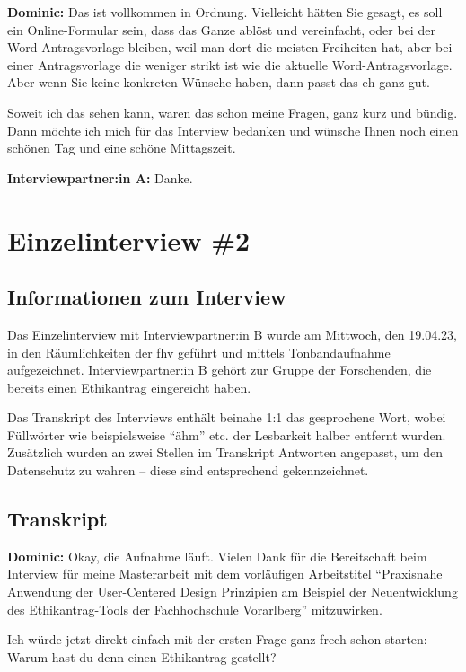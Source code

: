 \documentclass[a4paper,12pt,twoside]{scrreprt}
\begin{document}
\textbf{Dominic:} Das ist vollkommen in Ordnung. Vielleicht hätten Sie gesagt, es soll ein Online-Formular sein, dass das Ganze ablöst und vereinfacht, oder bei der Word-Antragsvorlage bleiben, weil man dort die meisten Freiheiten hat, aber bei einer Antragsvorlage die weniger strikt ist wie die aktuelle Word-Antragsvorlage. Aber wenn Sie keine konkreten Wünsche haben, dann passt das eh ganz gut. 

Soweit ich das sehen kann, waren das schon meine Fragen, ganz kurz und bündig. Dann möchte ich mich für das Interview bedanken und wünsche Ihnen noch einen schönen Tag und eine schöne Mittagszeit.

\textbf{Interviewpartner:in A:} Danke.

\chapter{Einzelinterview \#2}
\label{appendix:interview-2}

\section{Informationen zum Interview}
\label{appendix:interview-2-infos}

Das Einzelinterview mit Interviewpartner:in B wurde am Mittwoch, den 19.04.23, in den Räumlichkeiten der \ac{fhv} geführt und mittels Tonbandaufnahme aufgezeichnet. Interviewpartner:in B gehört zur Gruppe der Forschenden, die bereits einen Ethikantrag eingereicht haben.

Das Transkript des Interviews enthält beinahe 1:1 das gesprochene Wort, wobei Füllwörter wie beispielsweise \enquote{ähm} etc. der Lesbarkeit halber entfernt wurden. Zusätzlich wurden an zwei Stellen im Transkript Antworten angepasst, um den Datenschutz zu wahren -- diese sind entsprechend gekennzeichnet.

\section{Transkript}
\label{appendix:interview-2-transkript}

\textbf{Dominic:} Okay, die Aufnahme läuft. Vielen Dank für die Bereitschaft beim Interview für meine Masterarbeit mit dem vorläufigen Arbeitstitel \enquote{Praxisnahe Anwendung der User-Centered Design Prinzipien am Beispiel der Neuentwicklung des Ethikantrag-Tools der Fachhochschule Vorarlberg} mitzuwirken.

Ich würde jetzt direkt einfach mit der ersten Frage ganz frech schon starten: Warum hast du denn einen Ethikantrag gestellt?
\end{document}
